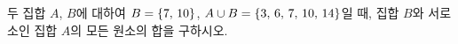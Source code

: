 두 집합 $A$, $B$에 대하여 $B=\{7,\mkern3mu 10\}$, $A\cup B=\{3,\mkern3mu 6,\mkern3mu 7,\mkern3mu 10,\mkern3mu 14\}$일 때, 집합 $B$와 서로소인 집합 $A$의 모든 원소의 합을 구하시오.
